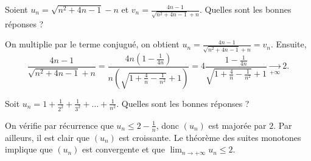 \begin{question}

Soient $\displaystyle u_n=\sqrt{n^2+4n-1}-n$ et $\displaystyle v_n=\frac{4n-1}{\sqrt{n^2+4n-1}+n}$. Quelles sont les bonnes réponses ?
\begin{answers}  
\end{answers}
\begin{explanations}
On multiplie par le terme conjugué, on obtient $\displaystyle u_n=\frac{4n-1}{\sqrt{n^2+4n-1}+n}=v_n$. Ensuite,
$$\frac{4n-1}{\sqrt{n^2+4n-1}+n}=\frac{4n\left(1-\frac{1}{4n}\right)}{n\left(\sqrt{1+\frac{4}{n}-\frac{1}{n^2}}+1\right)}=4\frac{1-\frac{1}{4n}}{\sqrt{1+\frac{4}{n}-\frac{1}{n^2}}+1}\underset{+\infty}{\longrightarrow}2.$$
\end{explanations}
\end{question}



\begin{question}

Soit $\displaystyle u_n=1+\frac{1}{2^2}+\frac{1}{3^2}+\dots +\frac{1}{n^2}$. Quelles sont les bonnes réponses ?
\begin{answers}  
\end{answers}
\begin{explanations}
On vérifie par récurrence que $\displaystyle u_n\leq 2-\frac{1}{n}$, donc $(u_n)$ est majorée par $2$. Par ailleurs, il est clair que $(u_n)$ est croissante. Le théorème des suites monotones implique que $(u_n)$ est convergente et que $\displaystyle \lim _{n\to +\infty}u_n\leq 2$.
\end{explanations}
\end{question}



